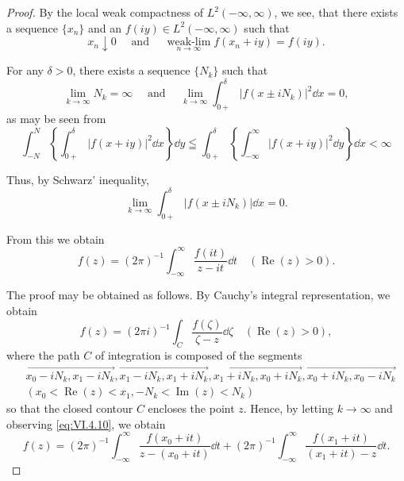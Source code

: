 \begin{proof}
 By the local weak compactness of $L^2(-\infty, \infty)$, we see, that there exists a sequence $\{x_n\}$ and an $f(iy) \in L^2(-\infty, \infty)$ such that 
\[
x _{n} \downarrow 0 \quad \text{ and } \quad \operatorname * {w e a k - l i m} _{n \to \infty} f (x _{n} + i y) = f (i y). \]

For any $\delta > 0$, there exists a sequence $\{N_k\}$ such that 
\[
\lim\limits _{k \rightarrow \infty} N _{k} = \infty \quad \text{ and } \quad \lim\limits _{k \rightarrow \infty} \int_{0+} ^{\delta} | f (x \pm i N _{k}) | ^{2} \dd x = 0,
\]
as may be seen from 
\[
\int_{-N} ^{N} \left\{\int_{0+} ^{\delta} | f (x + i y) | ^{2} \dd x \right\} \dd y \leqq \int_{0+} ^{\delta} \left\{\int_{- \infty} ^{\infty} | f (x + i y) | ^{2} \dd y \right\} \dd x < \infty
\]

Thus, by Schwarz' inequality, 
\begin{equation}\label{eq:VI.4.10}
\lim\limits _{k \rightarrow \infty} \int_{0+} ^{\delta} | f (x \pm i N _{k}) | \dd x = 0.
\end{equation}


From this we obtain 
\begin{equation}\label{eq:VI.4.11}
f (z) = (2 \pi) ^{-1} \int_{- \infty} ^{\infty} \frac {f (i t)}{z - i t} \dd t \quad (\operatorname{Re} (z) > 0).
\end{equation}

The proof may be obtained as follows. By Cauchy's integral representation, we obtain 
\begin{equation}\label{eq:VI.4.12}
f (z) = (2 \pi i) ^{-1} \int_{C} \frac {f (\zeta)}{\zeta - z} \dd \zeta \quad (\operatorname{Re} (z) > 0),
\end{equation}
where the path $C$ of integration is composed of the segments 
\[
\begin{aligned}
&\overrightarrow {x _{0} - i N _{k} , x _{1} - i N _{k}}, \overrightarrow {x _{1} - i N _{k} , x _{1} + i N _{k}}, \overrightarrow {x _{1} + i N _{k} , x _{0} + i N _{k}}, \overrightarrow {x _{0} + i N _{k} , x _{0} - i N _{k}}
\\
&(x _{0} < \operatorname{Re} (z) < x _{1}, - N _{k} < \operatorname{Im} (z) < N _{k})
\end{aligned}
\]
so that the closed contour $C$ encloses the point $z$. Hence, by letting $k \to \infty$ and observing \eqref{eq:VI.4.10}, we obtain 
\[
f (z) = (2 \pi) ^{-1} \int_{- \infty} ^{\infty} \frac {f \left(x _{0} + i t\right)}{z - \left(x _{0} + i t\right)} \dd t + (2 \pi) ^{-1} \int_{- \infty} ^{\infty} \frac {f \left(x _{1} + i t\right)}{\left(x _{1} + i t\right) - z} \dd t.
\]


\end{proof}
